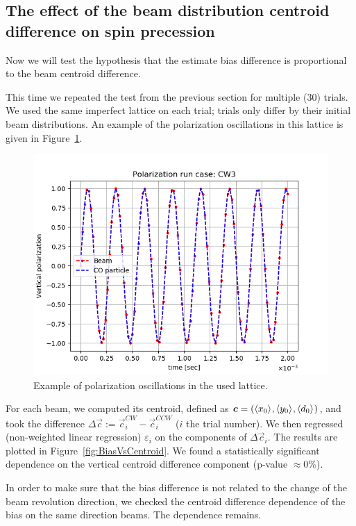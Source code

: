 \documentclass{article}
\begin{document}
\subsection{The effect of the beam distribution centroid difference on spin precession}

Now we will test the hypothesis that the estimate bias difference is proportional to the beam centroid difference. 

This time we repeated the test from the previous section for multiple (30) trials. We used the same imperfect lattice on each trial; trials only differ by their initial beam distributions. An example of the polarization oscillations in this lattice is given in Figure~\ref{fig:OscEx}.

\begin{figure}[!h]
  \centering
  \includegraphics[width=\linewidth]{img/spin_axis_motion/multiple/CW3_polarization}
  \caption{Example of polarization oscillations in the used lattice.\label{fig:OscEx}}
\end{figure}


For each beam, we computed its centroid, defined as $\vec c = (\avg{x_0}, \avg{y_0}, \avg{d_0})$, and took the difference $\Delta\vec c := \vec c^{CW}_i - \vec c^{CCW}_i$ ($i$ the trial number). We then regressed (non-weighted linear regression) $\varepsilon_i$ on the components of $\Delta\vec c_i$. The results are plotted in Figure~\ref{fig:BiasVsCentroid}. We found a statistically significant dependence on the vertical centroid difference component (p-value $\approx 0$\%).

In order to make sure that the bias difference is not related to the change of the beam revolution direction, we checked the centroid difference dependence of the bias on the same direction beams. The dependence remains.
\end{document}

